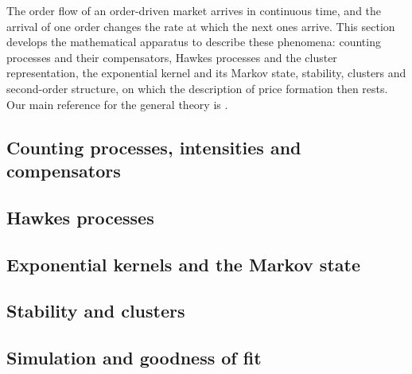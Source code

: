The order flow of an order-driven market arrives in continuous time,
and the arrival of one order changes the rate at which the next ones arrive.
This section develops the mathematical apparatus to describe these phenomena:
counting processes and their compensators,
Hawkes processes and the cluster representation,
the exponential kernel and its Markov state,
stability, clusters and second-order structure,
on which the description of price formation then rests.
Our main reference for the general theory is \cite[Chapter 14]{DVJ08int}.

\subsection{Counting processes, intensities and compensators}
\label{sec.countingProcesses}


\subsection{Hawkes processes}
\label{sec.hawkesProcesses}


\subsection{Exponential kernels and the Markov state}
\label{sec.exponentialKernels}


\subsection{Stability and clusters}
\label{sec.stability}


\subsection{Simulation and goodness of fit}
\label{sec.simulation}

